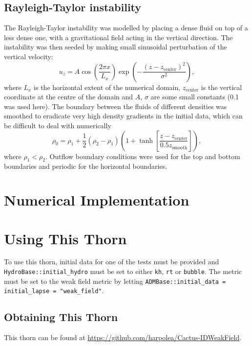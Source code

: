 \subsection{Rayleigh-Taylor instability}
\label{sec:Rayleigh-Taylor}
The Rayleigh-Taylor instability was modelled by placing a dense fluid on top of a less dense one, with a gravitational field acting in the vertical direction. The instability was then seeded by making small sinusoidal perturbation of the vertical velocity:
\begin{equation}
u_z = A \cos\left(\frac{2\pi x}{L_x}\right) \exp\left(-\frac{(z-z_\text{center})^2}{\sigma^2}\right), \label{eq:rt}
\end{equation}
where \(L_x\) is the horizontal extent of the numerical domain, \(z_\text{center}\) is the vertical coordinate at the centre of the domain and \(A\), \(\sigma\) are some small constants (0.1 was used here). The boundary between the fluids of different densities was smoothed to eradicate very high density gradients in the initial data, which can be difficult to deal with numerically
\begin{equation}
\rho_0 = \rho_1 + \frac{1}{2}(\rho_2 - \rho_1)\left(1 + \tanh\left[\frac{z - z_\text{center}}{0.5z_\text{smooth}}\right]\right),
\end{equation}
where \(\rho_1 < \rho_2\).
Outflow boundary conditions were used for the top and bottom boundaries and periodic for the horizontal boundaries. 

\section{Numerical Implementation}

\section{Using This Thorn}

To use this thorn, initial data for one of the tests must be provided and \texttt{HydroBase::initial\_hydro} must be set to either \texttt{kh}, \texttt{rt} or \texttt{bubble}. The metric must be set to the weak field metric by letting \texttt{ADMBase::initial\_data = initial\_lapse = "weak\_field"}.

\subsection{Obtaining This Thorn}

This thorn can be found at \url{https://github.com/harpolea/Cactus-IDWeakField}.

